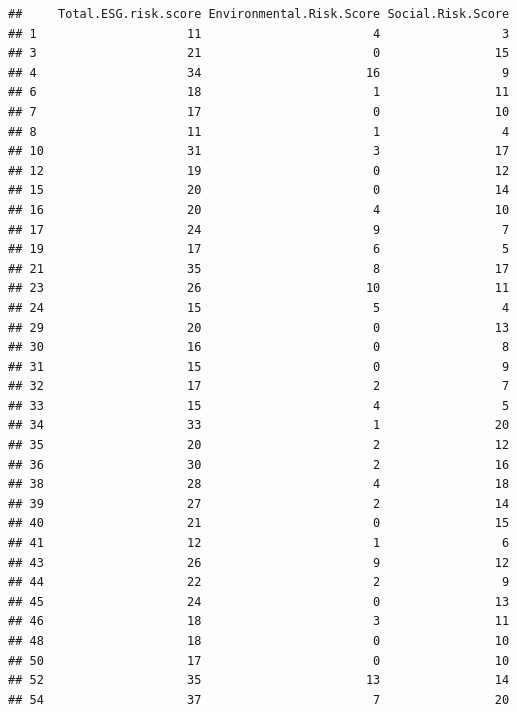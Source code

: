 \documentclass[
]{article}
\begin{document}
\begin{verbatim}
##     Total.ESG.risk.score Environmental.Risk.Score Social.Risk.Score
## 1                     11                        4                 3
## 3                     21                        0                15
## 4                     34                       16                 9
## 6                     18                        1                11
## 7                     17                        0                10
## 8                     11                        1                 4
## 10                    31                        3                17
## 12                    19                        0                12
## 15                    20                        0                14
## 16                    20                        4                10
## 17                    24                        9                 7
## 19                    17                        6                 5
## 21                    35                        8                17
## 23                    26                       10                11
## 24                    15                        5                 4
## 29                    20                        0                13
## 30                    16                        0                 8
## 31                    15                        0                 9
## 32                    17                        2                 7
## 33                    15                        4                 5
## 34                    33                        1                20
## 35                    20                        2                12
## 36                    30                        2                16
## 38                    28                        4                18
## 39                    27                        2                14
## 40                    21                        0                15
## 41                    12                        1                 6
## 43                    26                        9                12
## 44                    22                        2                 9
## 45                    24                        0                13
## 46                    18                        3                11
## 48                    18                        0                10
## 50                    17                        0                10
## 52                    35                       13                14
## 54                    37                        7                20

\end{verbatim}
\end{document}
